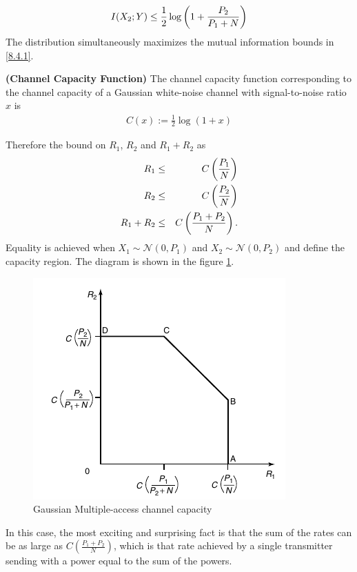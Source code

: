 %
\begin{eqnarray}
    I(X_2;Y) \leq \frac{1}{2}\log\left(1+\frac{P_2}{P_1+N}\right) 
\end{eqnarray}
The distribution simultaneously maximizes the mutual information bounds in \eqref{8.4.1}. 
%
\begin{tcolorbox}[boxrule=0pt,frame hidden,sharp corners,enhanced, opacityback=0, borderline west={2pt}{0pt}{red}]
\begin{defn} \textbf{(Channel Capacity Function)} The channel capacity function corresponding to the channel capacity of a Gaussian white-noise channel with signal-to-noise ratio $x$ is
%
\begin{eqnarray}
    C(x) := \frac{1}{2}\log(1+x)
\end{eqnarray}
%
\end{defn}
\end{tcolorbox}
%
Therefore the bound on $R_1$, $R_2$ and $R_1+R_2$ as
%
\begin{eqnarray}
    R_1 &\leq& C\left(\frac{P_1}{N}\right) \\
    R_2 &\leq& C\left(\frac{P_2}{N}\right) \\
    R_1+R_2 &\leq& C\left(\frac{P_1+P_2}{N}\right).
\end{eqnarray}
%
Equality is achieved when $X_1 \sim \mathcal{N}(0,P_1)$ and $X_2 \sim \mathcal{N}(0,P_2)$ and define the capacity region. The diagram is shown in the figure \ref{fig:GMACC}.
%
\begin{figure}[h]
    \centering
    \includegraphics[scale=0.40]{Diagrams/GMACC.png}
    \caption{Gaussian Multiple-access channel capacity}
    \label{fig:GMACC}
\end{figure}
%
In this case, the most exciting and surprising fact is that the sum of the rates can be as large as $C(\frac{P_1+P_2}{N})$, which is that rate achieved by a single transmitter sending with a power equal to the sum of the powers.
